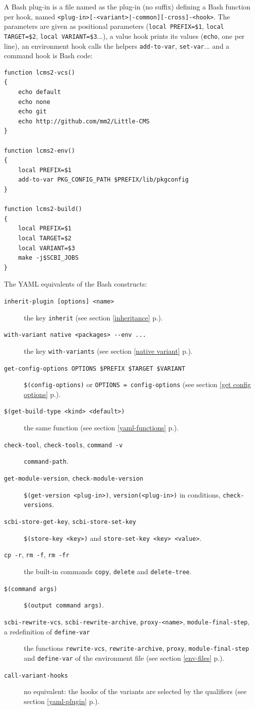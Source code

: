 \documentclass[a4paper,12pt,twoside]{article}
\newcommand{\code}[1]{\texttt{#1}}
\newcommand{\seeref}[1]{see section \ref{#1} p.\pageref{#1}}
\newcommand{\ddash}{-{}-}
\begin{document}
A Bash plug-in is a file named as the plug-in (no suffix) defining a Bash
function per hook, named \code{<plug-in>[-<variant>|-common][-cross]-<hook>}.
The parameters are given as positional parameters (\code{local
PREFIX=\$1}, \code{local TARGET=\$2}, \code{local VARIANT=\$3}...), a
value hook prints its values (\code{echo}, one per line), an environment
hook calls the helpers \code{add-to-var}, \code{set-var}... and a command
hook is Bash code:

\begin{lstlisting}
function lcms2-vcs()
{
	echo default
	echo none
	echo git
	echo http://github.com/mm2/Little-CMS
}

function lcms2-env()
{
	local PREFIX=$1
	add-to-var PKG_CONFIG_PATH $PREFIX/lib/pkgconfig
}

function lcms2-build()
{
	local PREFIX=$1
	local TARGET=$2
	local VARIANT=$3
	make -j$SCBI_JOBS
}
\end{lstlisting}

The YAML equivalents of the Bash constructs:

\begin{description}
	\item[\code{inherit-plugin [options] <name>}] the key \code{inherit} (\seeref{inheritance}).
	\item[\code{with-variant native <packages> \ddash{}env ...}] the key \code{with-variants} (\seeref{native variant}).
	\item[\code{get-config-options OPTIONS \$PREFIX \$TARGET \$VARIANT}] \code{\$(config-options)} or \code{OPTIONS = config-options} (\seeref{get config options}).
	\item[\code{\$(get-build-type <kind> <default>)}] the same function (\seeref{yaml-functions}).
	\item[\code{check-tool}, \code{check-tools}, \code{command -v}] \code{command-path}.
	\item[\code{get-module-version}, \code{check-module-version}] \code{\$(get-version <plug-in>)}, \code{version(<plug-in>)} in conditions, \code{check-versions}.
	\item[\code{scbi-store-get-key}, \code{scbi-store-set-key}] \code{\$(store-key <key>)} and \code{store-set-key <key> <value>}.
	\item[\code{cp -r}, \code{rm -f}, \code{rm -fr}] the built-in commands \code{copy}, \code{delete} and \code{delete-tree}.
	\item[\code{\$(command args)}] \code{\$(output command args)}.
	\item[\code{scbi-rewrite-vcs}, \code{scbi-rewrite-archive}, \code{proxy-<name>}, \code{module-final-step}, a redefinition of \code{define-var}] the functions \code{rewrite-vcs}, \code{rewrite-archive}, \code{proxy}, \code{module-final-step} and \code{define-var} of the environment file (\seeref{env-files}).
	\item[\code{call-variant-hooks}] no equivalent: the hooks of the variants are selected by the qualifiers (\seeref{yaml-plugin}).
\end{description}
\end{document}
